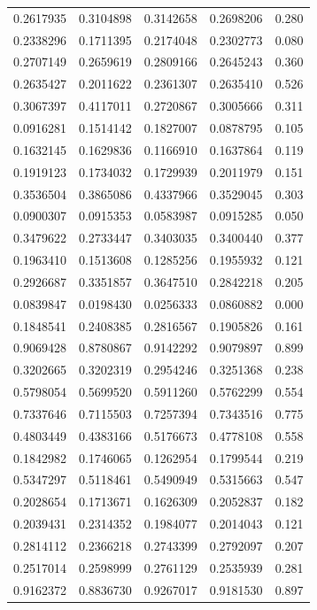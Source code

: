 \documentclass[
  letterpaper,
  DIV=11,
  numbers=noendperiod]{scrartcl}
\begin{document}
\begin{longtable}[]{@{}rrrrr@{}}
0.2617935 & 0.3104898 & 0.3142658 & 0.2698206 & 0.280 \\
0.2338296 & 0.1711395 & 0.2174048 & 0.2302773 & 0.080 \\
0.2707149 & 0.2659619 & 0.2809166 & 0.2645243 & 0.360 \\
0.2635427 & 0.2011622 & 0.2361307 & 0.2635410 & 0.526 \\
0.3067397 & 0.4117011 & 0.2720867 & 0.3005666 & 0.311 \\
0.0916281 & 0.1514142 & 0.1827007 & 0.0878795 & 0.105 \\
0.1632145 & 0.1629836 & 0.1166910 & 0.1637864 & 0.119 \\
0.1919123 & 0.1734032 & 0.1729939 & 0.2011979 & 0.151 \\
0.3536504 & 0.3865086 & 0.4337966 & 0.3529045 & 0.303 \\
0.0900307 & 0.0915353 & 0.0583987 & 0.0915285 & 0.050 \\
0.3479622 & 0.2733447 & 0.3403035 & 0.3400440 & 0.377 \\
0.1963410 & 0.1513608 & 0.1285256 & 0.1955932 & 0.121 \\
0.2926687 & 0.3351857 & 0.3647510 & 0.2842218 & 0.205 \\
0.0839847 & 0.0198430 & 0.0256333 & 0.0860882 & 0.000 \\
0.1848541 & 0.2408385 & 0.2816567 & 0.1905826 & 0.161 \\
0.9069428 & 0.8780867 & 0.9142292 & 0.9079897 & 0.899 \\
0.3202665 & 0.3202319 & 0.2954246 & 0.3251368 & 0.238 \\
0.5798054 & 0.5699520 & 0.5911260 & 0.5762299 & 0.554 \\
0.7337646 & 0.7115503 & 0.7257394 & 0.7343516 & 0.775 \\
0.4803449 & 0.4383166 & 0.5176673 & 0.4778108 & 0.558 \\
0.1842982 & 0.1746065 & 0.1262954 & 0.1799544 & 0.219 \\
0.5347297 & 0.5118461 & 0.5490949 & 0.5315663 & 0.547 \\
0.2028654 & 0.1713671 & 0.1626309 & 0.2052837 & 0.182 \\
0.2039431 & 0.2314352 & 0.1984077 & 0.2014043 & 0.121 \\
0.2814112 & 0.2366218 & 0.2743399 & 0.2792097 & 0.207 \\
0.2517014 & 0.2598999 & 0.2761129 & 0.2535939 & 0.281 \\
0.9162372 & 0.8836730 & 0.9267017 & 0.9181530 & 0.897 \\

\end{longtable}
\end{document}
